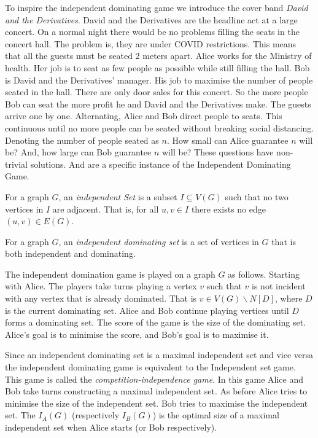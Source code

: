 To inspire the independent dominating game we introduce the cover band \textit{David and the Derivatives}. David and the Derivatives are the headline act at a large concert. On a normal night there would be no problems filling the seats in the concert hall. The problem is, they are under COVID restrictions. This means that all the guests must be seated 2 meters apart. Alice works for the Ministry of health. Her job is to seat as few people as possible while still filling the hall. Bob is David and the Derivatives' manager. His job to maximise the number of people seated in the hall. There are only door sales for this concert. So the more people Bob can seat the more profit he and David and the Derivatives make. The guests arrive one by one. Alternating, Alice and Bob direct people to seats. This continuous until no more people can be seated without breaking social distancing. Denoting the number of people seated as $n$. How small can Alice guarantee $n$ will be? And, how large can Bob guarantee $n$ will be? These questions have non-trivial solutions. And are a specific instance of the Independent Dominating Game.

\begin{definition}
    For a graph $G$, an \textit{independent Set} is a subset $I\subseteq V(G)$ such that no two vertices in $I$ are adjacent. That is, for all $u,v\in I$ there exists no edge $(u,v)\in E(G)$.
\end{definition}

\begin{definition}
   For a graph $G$, an \textit{independent dominating set} is a set of vertices in $G$ that is both independent and dominating.
\end{definition}

The independent domination game is played on a graph $G$ as follows. Starting with Alice. The players take turns playing a vertex $v$ such that $v$ is not incident with any vertex that is already dominated. That is $v\in V(G)\backslash N[D]$, where $D$ is the current dominating set. Alice and Bob continue playing vertices until $D$ forms a dominating set. The score of the game is the size of the dominating set. Alice's goal is to minimise the score, and Bob's goal is to maximise it.


Since an independent dominating set is a maximal independent set and vice versa the independent dominating game is equivalent to the Independent set game. This game is called the \textit{competition-independence game}. In this game Alice and Bob take turns constructing a maximal independent set. As before Alice tries to minimise the size of the independent set. Bob tries to maximise the independent set. The  $I_A(G)$ (respectively $I_B(G)$) is the optimal size of a maximal independent set when Alice starts (or Bob respectively). 

